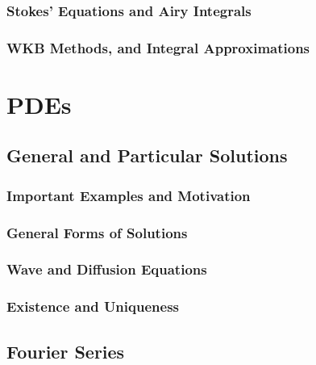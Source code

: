\documentclass[12pt, a4paper, oneside, openright, titlepage]{book}
\begin{document}
\section{Stokes' Equations and Airy Integrals}


\section{WKB Methods, and Integral Approximations}




\part{PDEs}


\chapter{General and Particular Solutions}

\section{Important Examples and Motivation}



\section{General Forms of Solutions}



\section{Wave and Diffusion Equations}



\section{Existence and Uniqueness}




\chapter{Fourier Series}
\end{document}
